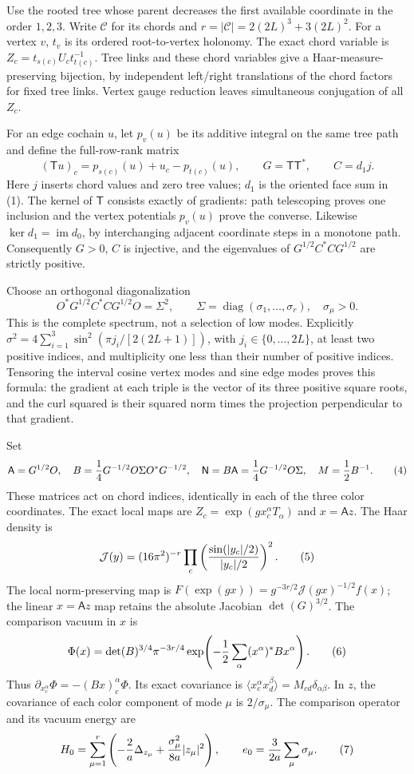 \documentclass[
  11pt,
]{article}
\begin{document}
Use the rooted tree whose parent decreases the first available
coordinate in the order \(1,2,3\). Write \(\mathcal C\) for its chords
and \(r=|\mathcal C|=2(2L)^3+3(2L)^2\). For a vertex \(v\), \(t_v\) is
its ordered root-to-vertex holonomy. The exact chord variable is
\(Z_c=t_{s(c)}U_ct_{t(c)}^{-1}\). Tree links and these chord variables
give a Haar-measure-preserving bijection, by independent left/right
translations of the chord factors for fixed tree links. Vertex gauge
reduction leaves simultaneous conjugation of all \(Z_c\).

For an edge cochain \(u\), let \(p_v(u)\) be its additive integral on
the same tree path and define the full-row-rank matrix \[
 (\mathsf T u)_c=p_{s(c)}(u)+u_c-p_{t(c)}(u),\qquad
 G=\mathsf T\mathsf T^*,\qquad C=d_1j.
 \tag{2}
\] Here \(j\) inserts chord values and zero tree values; \(d_1\) is the
oriented face sum in (1). The kernel of \(\mathsf T\) consists exactly
of gradients: path telescoping proves one inclusion and the vertex
potentials \(p_v(u)\) prove the converse. Likewise
\(\ker d_1=\operatorname{im}d_0\), by interchanging adjacent coordinate
steps in a monotone path. Consequently \(G>0\), \(C\) is injective, and
the eigenvalues of \(G^{1/2}C^*CG^{1/2}\) are strictly positive.

Choose an orthogonal diagonalization \[
 O^*G^{1/2}C^*CG^{1/2}O=\Sigma^2,\qquad
 \Sigma=\operatorname{diag}(\sigma_1,\ldots,\sigma_r),\quad \sigma_\mu>0.
 \tag{3}
\] This is the complete spectrum, not a selection of low modes.
Explicitly \(\sigma^2=4\sum_{i=1}^3\sin^2(\pi j_i/[2(2L+1)])\), with
\(j_i\in\{0,\ldots,2L\}\), at least two positive indices, and
multiplicity one less than their number of positive indices. Tensoring
the interval cosine vertex modes and sine edge modes proves this
formula: the gradient at each triple is the vector of its three positive
square roots, and the curl squared is their squared norm times the
projection perpendicular to that gradient.

Set \[
 \mathsf A=G^{1/2}O,\quad
 B={1\over4}G^{-1/2}O\Sigma O^*G^{-1/2},\quad
 \mathsf N=B\mathsf A={1\over4}G^{-1/2}O\Sigma,\quad M={1\over2}B^{-1}.
 \tag{4}
\] These matrices act on chord indices, identically in each of the three
color coordinates. The exact local maps are \(Z_c=\exp(gx_c^\alpha
T_\alpha)\) and \(x=\mathsf A z\). The Haar density is \[
 \mathcal J(y)=(16\pi^2)^{-r}
  \prod_c\left({\sin(|y_c|/2)\over |y_c|/2}\right)^2.
 \tag{5}
\] The local norm-preserving map is
\(F(\exp(gx))=g^{-3r/2}\mathcal J(gx)^{-1/2}f(x)\); the linear
\(x=\mathsf A z\) map retains the absolute Jacobian \(\det(G)^{3/2}\).
The comparison vacuum in \(x\) is \[
 \Phi(x)=\det(B)^{3/4}\pi^{-3r/4}
           \exp\!\left(-{1\over2}\sum_\alpha(x^\alpha)^*Bx^\alpha\right).
 \tag{6}
\] Thus \(\partial_{x_c^\alpha}\Phi=-(Bx)_c^\alpha\Phi\). Its exact
covariance is
\(\langle x_c^\alpha x_d^\beta\rangle=M_{cd}\delta_{\alpha\beta}\). In
\(z\), the covariance of each color component of mode \(\mu\) is
\(2/\sigma_\mu\). The comparison operator and its vacuum energy are \[
 H_0=\sum_{\mu=1}^r
       \left(-{2\over a}\Delta_{z_\mu}
                    +{\sigma_\mu^2\over8a}|z_\mu|^2\right),\qquad
 e_0={3\over2a}\sum_\mu\sigma_\mu.
 \tag{7}
\]
\end{document}
